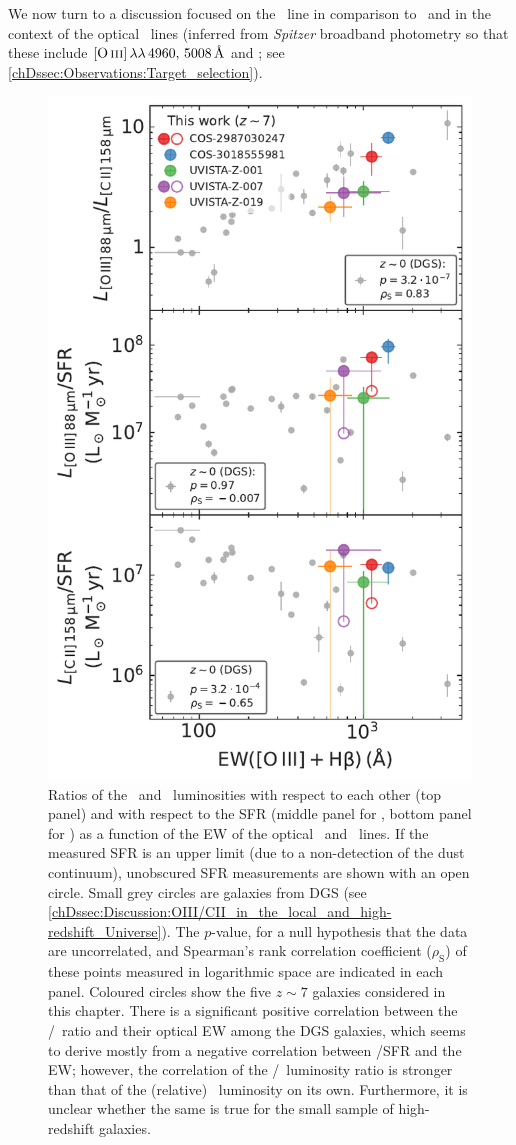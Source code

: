We now turn to a discussion focused on the \OIIILam\ line in comparison to \CIILam\ and in the context of the optical \OIIIf\ lines (inferred from \textit{Spitzer} broadband photometry so that these include $\OIIIf \, \lambda \lambda \, 4960, \, 5008 \, \Angstrom$ and \Hbeta; see \cref{chDssec:Observations:Target_selection}).
\begin{figure}
    \centering
    \includegraphics[width=0.6\linewidth]{"Plots/ChapterD/EW_OIII_Hb_OIII_CII"}
    \caption[Relative luminosities of \OIIILam\ and \CIILam\ as a function of $\text{EW} ( \OIIIf + \Hbeta )$.]{Ratios of the \OIIILam\ and \CIILam\ luminosities with respect to each other (top panel) and with respect to the SFR (middle panel for \OIIIf, bottom panel for \CII) as a function of the EW of the optical \OIIIf\ and \Hbeta\ lines. If the measured SFR is an upper limit (due to a non-detection of the dust continuum), unobscured SFR measurements are shown with an open circle. Small grey circles are galaxies from DGS (see \cref{chDssec:Discussion:OIII/CII_in_the_local_and_high-redshift_Universe}). The $p$-value, for a null hypothesis that the data are uncorrelated, and Spearman's rank correlation coefficient ($\rho_\text{S}$) of these points measured in logarithmic space are indicated in each panel. Coloured circles show the five $z \sim 7$ galaxies considered in this chapter. There is a significant positive correlation between the \OIIIf/\CII\ ratio and their optical EW among the DGS galaxies, which seems to derive mostly from a negative correlation between \CII/SFR and the EW; however, the correlation of the \OIIIf/\CII\ luminosity ratio is stronger than that of the (relative) \CII\ luminosity on its own. Furthermore, it is unclear whether the same is true for the small sample of high-redshift galaxies.
    }
    \label{chDfig:OIII/CII_correlations}
\end{figure}

